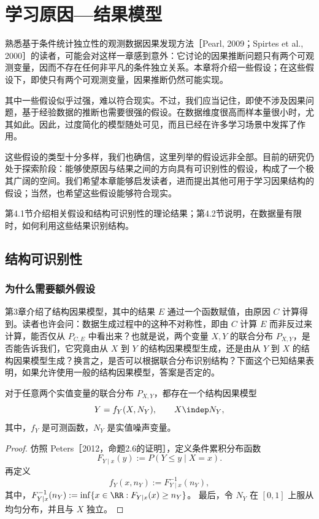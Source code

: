 \chapter{学习原因—结果模型}
\label{ch:learning-cause-effect}
\providecommand{\chfouraeq}{\mathrel{\stackrel{+}{=}}}
\providecommand{\chfouraleq}{\mathrel{\stackrel{+}{\leq}}}
\providecommand{\chfourtnote}[1]{\stepcounter{chfourtransnote}\begingroup
\renewcommand{\thefootnote}{译注\arabic{chfourtransnote}}\footnote{#1}\addtocounter{footnote}{-1}\endgroup}

熟悉基于条件统计独立性的观测数据因果发现方法［Pearl, 2009；Spirtes et al., 2000］的读者，可能会对这样一章感到意外：它讨论的因果推断问题只有两个可观测变量，因而不存在任何非平凡的条件独立关系。本章将介绍一些假设；在这些假设下，即使只有两个可观测变量，因果推断仍然可能实现。

其中一些假设似乎过强，难以符合现实。不过，我们应当记住，即使不涉及因果问题，基于经验数据的推断也需要很强的假设。在数据维度很高而样本量很小时，尤其如此。因此，过度简化的模型随处可见，而且已经在许多学习场景中发挥了作用。

这些假设的类型十分多样，我们也确信，这里列举的假设远非全部。目前的研究仍处于探索阶段：能够使原因与结果之间的方向具有可识别性的假设，构成了一个极其广阔的空间。我们希望本章能够启发读者，进而提出其他可用于学习因果结构的假设；当然，也希望这些假设能够符合现实。

第4.1节介绍相关假设和结构可识别性的理论结果；第4.2节说明，在数据量有限时，如何利用这些结果识别结构。

\section{结构可识别性}
\subsection{为什么需要额外假设}

第3章介绍了结构因果模型，其中的结果 $E$ 通过一个函数赋值，由原因 $C$ 计算得到。读者也许会问：数据生成过程中的这种不对称性，即由 $C$ 计算 $E$ 而非反过来计算，能否仅从 $P_{C,E}$ 中看出来？也就是说，两个变量 $X,Y$ 的联合分布 $P_{X,Y}$，是否能告诉我们，它究竟由从 $X$ 到 $Y$ 的结构因果模型生成，还是由从 $Y$ 到 $X$ 的结构因果模型生成？换言之，是否可以根据联合分布识别结构？下面这个已知结果表明，如果允许使用一般的结构因果模型，答案是否定的。

\begin{proposition}[图结构的非唯一性]
对于任意两个实值变量的联合分布 $P_{X,Y}$，都存在一个结构因果模型
\[
 Y=f_Y(X,N_Y),\qquad X\indep N_Y,
\]
其中，$f_Y$ 是可测函数，$N_Y$ 是实值噪声变量。
\end{proposition}
\begin{proof}
仿照 Peters［2012，命题2.6的证明］，定义条件累积分布函数
\[
 F_{Y\mid x}(y):=P(Y\leq y\mid X=x).
\]
再定义
\[
 f_Y(x,n_Y):=F^{-1}_{Y\mid x}(n_Y),
\]
其中，$F^{-1}_{Y\mid x}(n_Y):=\inf\{x\in\RR:F_{Y\mid x}(x)\geq n_Y\}$。
最后，令 $N_Y$ 在 $[0,1]$ 上服从均匀分布，并且与 $X$ 独立。
\end{proof}

